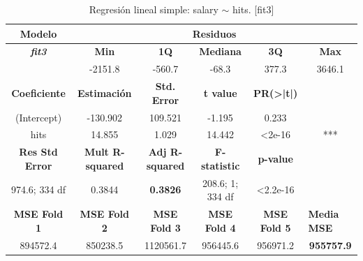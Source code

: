 \documentclass[a4paper,12pt, oneside]{book}
\begin{document}
\begin{table}[H]
\footnotesize
\centering
\begin{tabular}{cccccc}
\hline
\textbf{Modelo} & \multicolumn{5}{c}{\textbf{Residuos}} \\ \hline
\textit{\textbf{fit3}} & \textbf{Min} & \textbf{1Q} & \textbf{Mediana} & \textbf{3Q} & \textbf{Max} \\ \cline{2-6} 
\multicolumn{1}{l}{} & -2151.8 & -560.7 & -68.3 & 377.3 & 3646.1 \\ \cline{1-5}
\textbf{Coeficiente} & \textbf{Estimación} & \textbf{Std. Error} & \textbf{t value} & \textbf{PR(\textgreater{}|t|)} & \multicolumn{1}{l}{} \\ \cline{1-5}
(Intercept) & -130.902 & 109.521 & -1.195 & 0.233 &  \\
hits & 14.855 & 1.029 & 14.442 & \textless{}2e-16 & *** \\ \cline{1-5}
\textbf{Res Std Error} & \textbf{Mult R-squared} & \textbf{Adj R-squared} & \textbf{F-statistic} & \textbf{p-value} & \multicolumn{1}{l}{} \\ \cline{1-5}
974.6; 334 df & 0.3844 & \textbf{0.3826} & 208.6; 1; 334 df & \textless{}2.2e-16 & \multicolumn{1}{l}{} \\ \hline
\textbf{MSE Fold 1} & \textbf{MSE Fold 2} & \textbf{MSE Fold 3} & \textbf{MSE Fold 4} & \textbf{MSE Fold 5} & \multicolumn{1}{l}{\textbf{Media MSE}} \\ \hline
894572.4 & 850238.5 & 1120561.7 & 956445.6 & 956971.2 & \textbf{955757.9}
\end{tabular}
\caption{Regresión lineal simple: salary $\sim$ hits. {[}fit3{]}}
\label{tab:fit3}
\end{table}
\end{document}
